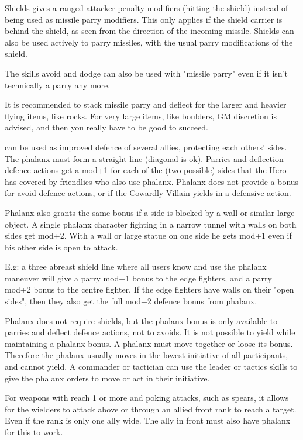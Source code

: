 Shields gives a ranged attacker penalty modifiers (hitting the shield) instead of being used as missile parry modifiers. This only applies if the shield carrier is behind the shield, as seen from the direction of the incoming missile. Shields can also be used actively to parry missiles, with the usual parry modifications of the shield.

The skills avoid and dodge can also be used with "missile parry" even if it isn't technically a parry any more.

It is recommended to stack missile parry and deflect for the larger and heavier flying items, like rocks. For very large items, like boulders, GM discretion is advised, and then you really have to be good to succeed.


 can be used as improved defence of several allies, protecting each others' sides. The phalanx must form a straight line (diagonal is ok).
Parries and deflection defence actions get a mod+1 for each of the (two possible) sides that the Hero has covered by friendlies who also use phalanx. Phalanx does not provide a bonus for avoid defence actions, or if the Cowardly Villain yields in a defensive action.

Phalanx also grants the same bonus if a side is blocked by a wall or similar large object. A single phalanx character fighting in a narrow tunnel with walls on both sides get mod+2. With a wall or large statue on one side he gets mod+1 even if his other side is open to attack.

E.g: a three abreast shield line where all users know and use the phalanx maneuver will give a parry mod+1 bonus to the edge fighters, and a parry mod+2 bonus to the centre fighter. If the edge fighters have walls on their "open sides", then they also get the full mod+2 defence bonus from phalanx.

Phalanx does not require shields, but the phalanx bonus is only available to parries and deflect defence actions, not to avoids.
It is not possible to yield while maintaining a phalanx bonus. A phalanx must move together or loose its bonus. Therefore the phalanx usually moves in the lowest initiative of all participants, and cannot yield. A commander or tactician can use the leader or tactics skills to give the phalanx orders to move or act in their initiative.

For weapons with reach 1 or more and poking attacks, such as spears, it allows for the wielders to attack above or through an allied front rank to reach a target. Even if the rank is only one ally wide. The ally in front must also have phalanx for this to work.

